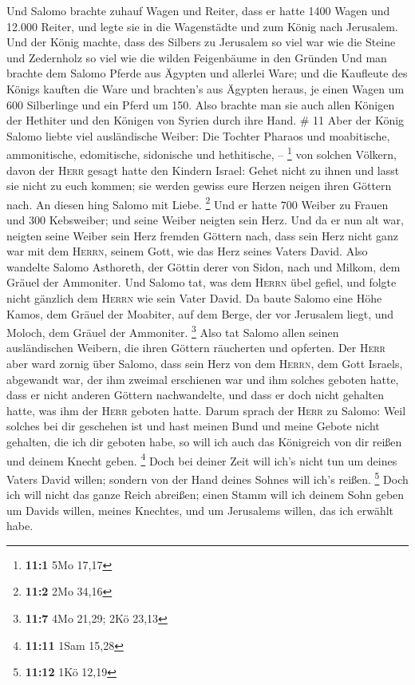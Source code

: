  Und Salomo brachte zuhauf Wagen und Reiter, dass er
hatte 1400 Wagen und 12.000 Reiter, und legte sie in die Wagenstädte und
zum König nach Jerusalem.  Und der König machte, dass des
Silbers zu Jerusalem so viel war wie die Steine und Zedernholz so viel
wie die wilden Feigenbäume in den Gründen  Und man
brachte dem Salomo Pferde aus Ägypten und allerlei Ware; und die
Kaufleute des Königs kauften die Ware  und brachten's aus
Ägypten heraus, je einen Wagen um 600 Silberlinge und ein Pferd um 150.
Also brachte man sie auch allen Königen der Hethiter und den Königen von
Syrien durch ihre Hand. \# 11  Aber der König Salomo
liebte viel ausländische Weiber: Die Tochter Pharaos und moabitische,
ammonitische, edomitische, sidonische und hethitische, -- \footnote{\textbf{11:1}
  5Mo 17,17}  von solchen Völkern, davon der \textsc{Herr}
gesagt hatte den Kindern Israel: Gehet nicht zu ihnen und lasst sie
nicht zu euch kommen; sie werden gewiss eure Herzen neigen ihren Göttern
nach. An diesen hing Salomo mit Liebe. \footnote{\textbf{11:2} 2Mo 34,16}
 Und er hatte 700 Weiber zu Frauen und 300 Kebsweiber; und
seine Weiber neigten sein Herz.  Und da er nun alt war,
neigten seine Weiber sein Herz fremden Göttern nach, dass sein Herz
nicht ganz war mit dem \textsc{Herrn}, seinem Gott, wie das Herz seines
Vaters David.  Also wandelte Salomo Asthoreth, der Göttin
derer von Sidon, nach und Milkom, dem Gräuel der Ammoniter.
 Und Salomo tat, was dem \textsc{Herrn} übel gefiel, und
folgte nicht gänzlich dem \textsc{Herrn} wie sein Vater David.
 Da baute Salomo eine Höhe Kamos, dem Gräuel der Moabiter,
auf dem Berge, der vor Jerusalem liegt, und Moloch, dem Gräuel der
Ammoniter. \footnote{\textbf{11:7} 4Mo 21,29; 2Kö 23,13} 
Also tat Salomo allen seinen ausländischen Weibern, die ihren Göttern
räucherten und opferten.  Der \textsc{Herr} aber ward
zornig über Salomo, dass sein Herz von dem \textsc{Herrn}, dem Gott
Israels, abgewandt war, der ihm zweimal erschienen war 
und ihm solches geboten hatte, dass er nicht anderen Göttern
nachwandelte, und dass er doch nicht gehalten hatte, was ihm der
\textsc{Herr} geboten hatte.  Darum sprach der
\textsc{Herr} zu Salomo: Weil solches bei dir geschehen ist und hast
meinen Bund und meine Gebote nicht gehalten, die ich dir geboten habe,
so will ich auch das Königreich von dir reißen und deinem Knecht geben.
\footnote{\textbf{11:11} 1Sam 15,28}  Doch bei deiner
Zeit will ich's nicht tun um deines Vaters David willen; sondern von der
Hand deines Sohnes will ich's reißen. \footnote{\textbf{11:12} 1Kö 12,19}
 Doch ich will nicht das ganze Reich abreißen; einen
Stamm will ich deinem Sohn geben um Davids willen, meines Knechtes, und
um Jerusalems willen, das ich erwählt habe.

